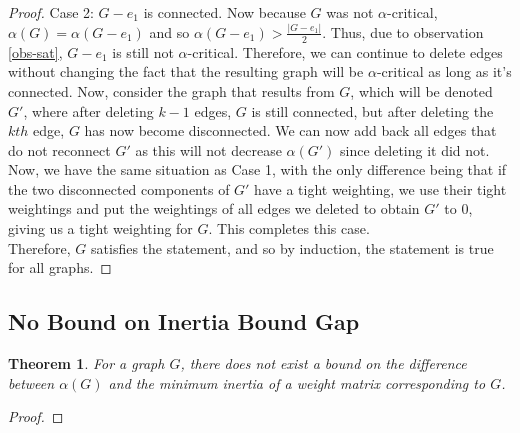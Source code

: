 \documentclass[12pt]{article}
\theoremstyle{parenbold}
\newtheorem{theorem}{Theorem}[section]
\begin{document}
\begin{proof}
Case 2: $G-e_1$ is connected. Now because $G$ was not $\alpha$-critical, $\alpha(G) = \alpha(G-e_1)$ and so $\alpha(G-e_1) > \frac{|G-e_1|}{2}$. Thus, due to observation \ref{obs-sat}, $G-e_1$ is still not $\alpha$-critical. Therefore, we can continue to delete edges without changing the fact that the resulting graph will be $\alpha$-critical as long as it's connected. Now, consider the graph that results from $G$, which will be denoted $G'$, where after deleting $k-1$ edges, $G$ is still connected, but after deleting the $kth$ edge, $G$ has now become disconnected. We can now add back all edges that do not reconnect $G'$ as this will not decrease $\alpha(G')$ since deleting it did not. Now, we have the same situation as Case 1, with the only difference being that if the two disconnected components of $G'$ have a tight weighting, we use their tight weightings and put the weightings of all edges we deleted to obtain $G'$ to 0, giving us a tight weighting for $G$. This completes this case. \\

Therefore, $G$ satisfies the statement, and so by induction, the statement is true for all graphs.
\end{proof}

\subsection{No Bound on Inertia Bound Gap}

\begin{theorem}
For a graph $G$, there does not exist a bound on the difference between $\alpha(G)$ and the minimum inertia of a weight matrix corresponding to $G$.
\end{theorem}

\begin{proof}

\end{proof}



\end{document}
